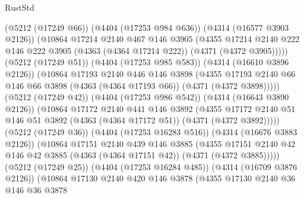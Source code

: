 \begin{lexlean}{RustStd}
\begin{coremodule}
{\begin{coremodule}
{{{{{{{{{{{{{{{{                    (@5212 (@17249 @66))
                    (@4404 (@17253 @984 @636))
                    (@4314 (@16577 @3903 @2126))
                    (@10864
                      @17214
                      @2140
                      @467
                      @146
                      @3905
                      (@4355
                        @17214
                        @2140
                        @222
                        @146
                        @222
                        @3905
                        (@4363 (@4364 @17214 @222))
                        (@4371 (@4372 @3905)))))
                  (@5212 (@17249 @51))
                  (@4404 (@17253 @985 @583))
                  (@4314 (@16610 @3896 @2126))
                  (@10864
                    @17193
                    @2140
                    @446
                    @146
                    @3898
                    (@4355
                      @17193
                      @2140
                      @66
                      @146
                      @66
                      @3898
                      (@4363 (@4364 @17193 @66))
                      (@4371 (@4372 @3898)))))
                (@5212 (@17249 @42))
                (@4404 (@17253 @986 @542))
                (@4314 (@16643 @3890 @2126))
                (@10864
                  @17172
                  @2140
                  @441
                  @146
                  @3892
                  (@4355
                    @17172
                    @2140
                    @51
                    @146
                    @51
                    @3892
                    (@4363 (@4364 @17172 @51))
                    (@4371 (@4372 @3892)))))
              (@5212 (@17249 @36))
              (@4404 (@17253 @16283 @516))
              (@4314 (@16676 @3883 @2126))
              (@10864
                @17151
                @2140
                @439
                @146
                @3885
                (@4355
                  @17151
                  @2140
                  @42
                  @146
                  @42
                  @3885
                  (@4363 (@4364 @17151 @42))
                  (@4371 (@4372 @3885)))))
            (@5212 (@17249 @25))
            (@4404 (@17253 @16284 @485))
            (@4314 (@16709 @3876 @2126))
            (@10864
              @17130
              @2140
              @420
              @146
              @3878
              (@4355
                @17130
                @2140
                @36
                @146
                @36
                @3878
}}}}}}}}}}}}}}}}
\end{coremodule}}
\end{coremodule}
\end{lexlean}
